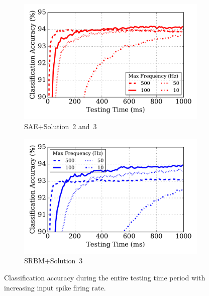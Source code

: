 \begin{figure}
	\centering
	\begin{subfigure}[t]{0.45\textwidth}
		\includegraphics[width=\textwidth]{pics_sdlm/43_MNIST_SAE_all/result_freq.pdf}
		\caption{SAE+Solution~2 and~3}
	\end{subfigure}
	\begin{subfigure}[t]{0.45\textwidth}
		\includegraphics[width=\textwidth]{pics_sdlm/51_MNIST_SRBM_teach/result_freq.pdf}
		\caption{SRBM+Solution~3}
	\end{subfigure}
	\caption{Classification accuracy during the entire testing time period with increasing input spike firing rate.}
	\label{fig:sdlm_freq}
\end{figure}

